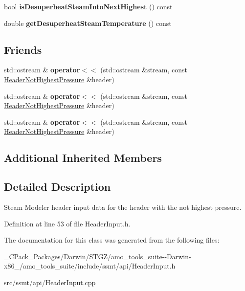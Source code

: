 \begin{DoxyCompactItemize}
\item 
\mbox{\label{class_header_not_highest_pressure_af4178100c3856d70293fdbd3dfea7c74}} 
bool {\bfseries is\+Desuperheat\+Steam\+Into\+Next\+Highest} () const
\item 
\mbox{\label{class_header_not_highest_pressure_a773589763baa84fc50e0e4b20f473e4c}} 
double {\bfseries get\+Desuperheat\+Steam\+Temperature} () const
\end{DoxyCompactItemize}
\subsection*{Friends}
\begin{DoxyCompactItemize}
\item 
\mbox{\label{class_header_not_highest_pressure_a11be4c989608a4596788cbd7e139df7e}} 
std\+::ostream \& {\bfseries operator$<$$<$} (std\+::ostream \&stream, const \hyperlink{class_header_not_highest_pressure}{Header\+Not\+Highest\+Pressure} \&header)
\item 
\mbox{\label{class_header_not_highest_pressure_a11be4c989608a4596788cbd7e139df7e}} 
std\+::ostream \& {\bfseries operator$<$$<$} (std\+::ostream \&stream, const \hyperlink{class_header_not_highest_pressure}{Header\+Not\+Highest\+Pressure} \&header)
\item 
\mbox{\label{class_header_not_highest_pressure_a11be4c989608a4596788cbd7e139df7e}} 
std\+::ostream \& {\bfseries operator$<$$<$} (std\+::ostream \&stream, const \hyperlink{class_header_not_highest_pressure}{Header\+Not\+Highest\+Pressure} \&header)
\end{DoxyCompactItemize}
\subsection*{Additional Inherited Members}


\subsection{Detailed Description}
Steam Modeler header input data for the header with the not highest pressure. 

Definition at line 53 of file Header\+Input.\+h.



The documentation for this class was generated from the following files\+:\begin{DoxyCompactItemize}
\item 
\+\_\+\+C\+Pack\+\_\+\+Packages/\+Darwin/\+S\+T\+G\+Z/amo\+\_\+tools\+\_\+suite-\/-\/\+Darwin-\/x86\+\_/amo\+\_\+tools\+\_\+suite/include/ssmt/api/Header\+Input.\+h\item 
src/ssmt/api/Header\+Input.\+cpp\end{DoxyCompactItemize}
